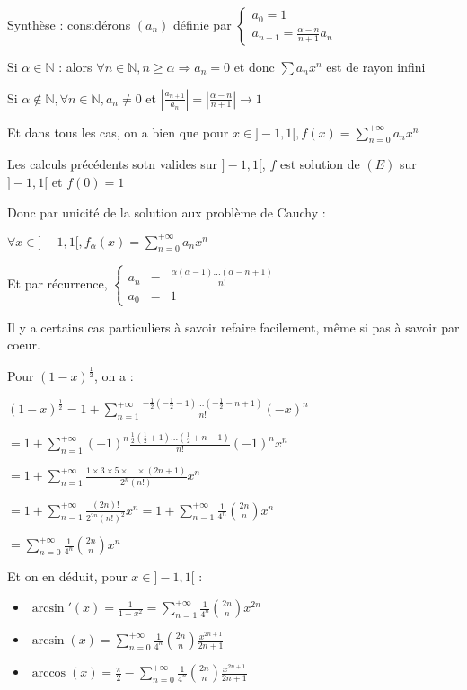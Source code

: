 \documentclass[a4paper,12pt]{book}
\def\N{\mathbb{N}}
\begin{document}
{\par Synthèse : considérons $(a_n)$ définie par $\left\{\begin{array}{r} a_0 =1 \\ a_{n+1} = \frac{\alpha - n}{n+1}a_n\end{array}\right.$ \par Si $\alpha\in\N$ : alors $\forall n\in\N, n\geq \alpha\Rightarrow a_n =0$ et donc $\sum a_nx^n$ est de rayon infini \par Si $\alpha\notin\N, \forall n\in\N, a_n\neq 0$ et $\left\vert\frac{a_{n+1}}{a_n}\right\vert =\left\vert\frac{\alpha-n}{n+1}\right\vert\to 1$ \par Et dans tous les cas, on a bien que pour $x\in]-1,1[, f(x)=\sum\limits_{n=0}^{+\infty}a_nx^n$
\par Les calculs précédents sotn valides sur $]-1,1[$, $f$ est solution de $(E)$ sur $]-1,1[$ et $f(0)=1$ \par Donc par unicité de la solution aux problème de Cauchy : \par $\forall x\in ]-1,1[, f_\alpha(x) =\sum\limits_{n=0}^{+\infty}a_nx^n$
\par Et par récurrence, $\left\{\begin{array}{rcl} a_n & = &\frac{\alpha(\alpha-1)...(\alpha-n+1)}{n!} \\ a_0 & = & 1\end{array}\right.$
}
Il y a certains cas particuliers à savoir refaire facilement, même si pas à savoir par coeur.
\par Pour $(1-x)^{\frac{1}{2}}$, on a : \par $(1-x)^{\frac{1}{2}} = 1+ \sum\limits_{n=1}^{+\infty} \frac{-\frac{1}{2}\left(-\frac{1}{2}-1\right)...\left(-\frac{1}{2}-n+1\right)}{n!}(-x)^n$ \par $=1+ \sum\limits_{n=1}^{+\infty}(-1)^n\frac{\frac{1}{2}\left(\frac{1}{2}+1\right)...\left(\frac{1}{2}+n-1\right)}{n!}(-1)^nx^n$ \par $=1+\sum\limits_{n=1}^{+\infty}\frac{1\times 3\times 5\times...\times (2n+1)}{2^n(n!)}x^n$ \par $=1+\sum\limits_{n=1}^{+\infty}\frac{(2n)!}{2^{2n}(n!)^2}x^n = 1+\sum\limits_{n=1}^{+\infty}\frac{1}{4^n}\binom{2n}{n}x^n$ \par $=\sum\limits_{n=0}^{+\infty}\frac{1}{4^n}\binom{2n}{n}x^n$
\par Et on en déduit, pour $x\in]-1,1[$ :\begin{itemize}
    \item $\arcsin'(x)=\frac{1}{1-x^2} = \sum\limits_{n=1}^{+\infty}\frac{1}{4^n}\binom{2n}{n}x^{2n}$
    \item $\arcsin(x) =\sum\limits_{n=0}^{+\infty}\frac{1}{4^n}\binom{2n}{n}\frac{x^{2n+1}}{2n+1}$
    \item $\arccos(x) =\frac{\pi}{2}-\sum\limits_{n=0}^{+\infty}\frac{1}{4^n}\binom{2n}{n}\frac{x^{2n+1}}{2n+1}$
\end{itemize}
\end{document}
